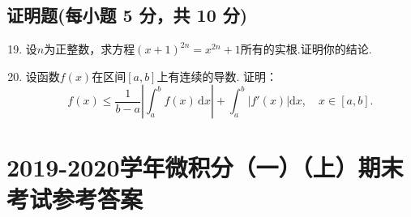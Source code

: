 \documentclass[../main.tex]{subfiles}
\begin{document}
\section{证明题(每小题 5 分，共 10 分)}
\begin{enumerate}
    \setcounter{enumi}{18}
    \item 设$n$为正整数，求方程$(x+1)^{2n}=x^{2n}+1$所有的实根.证明你的结论.
          \vspace{15em}

    \item 设函数$f(x)$在区间$[a,b]$上有连续的导数. 证明：
          \[
              f(x)\leq \frac{1}{b-a}\left|\int_{a}^{b}f(x)\,\mathrm{d}x\right|+\int_{a}^{b}
              \left|f'(x)\right|\mathrm{d}x,\quad x\in[a,b].
          \]
          \vspace{15em}
\end{enumerate}

\chapter{2019-2020学年微积分（一）（上）期末考试参考答案}
\end{document}
